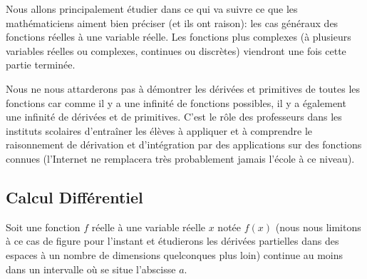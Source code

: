 	Nous allons principalement étudier dans ce qui va suivre ce que les mathématiciens aiment bien préciser (et ils ont raison): les cas généraux des fonctions réelles à une variable réelle. Les fonctions plus complexes (à plusieurs variables réelles ou complexes, continues ou discrètes) viendront une fois cette partie terminée.

	\begin{tcolorbox}[title=Remarque,colframe=black,arc=10pt]
	Nous ne nous attarderons pas à démontrer les dérivées et primitives de toutes les fonctions car comme il y a une infinité de fonctions possibles, il y a également une infinité de dérivées et de primitives. C'est le rôle des professeurs dans les instituts scolaires d'entraîner les élèves à appliquer et à comprendre le raisonnement de dérivation et d'intégration par des applications sur des fonctions connues (l'Internet ne remplacera très probablement jamais l'école à ce niveau).
	\end{tcolorbox}	
	
	\subsection{Calcul Différentiel}\label{differential calculus}
	Soit une fonction $f$ réelle à une variable réelle $x$ notée $f(x)$ (nous nous limitons à ce cas de figure pour l'instant et étudierons les dérivées partielles dans des espaces à un nombre de dimensions quelconques plus loin) continue au moins dans un intervalle où se situe l'abscisse $a$.

